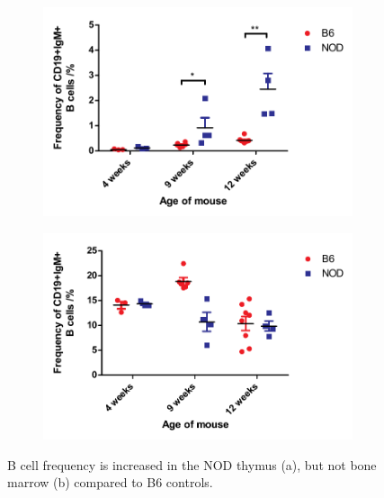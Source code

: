 \begin{figure}
	\begin{subfigure}{0.5\textwidth}
	\includegraphics[width=\textwidth]{Figures/IncthyBcells.pdf}
	\caption{}
	\label{subfig:IncthyBcells}
	\end{subfigure}
	\begin{subfigure}{0.5\textwidth}
	\includegraphics[width=\textwidth]{Figures/BMBcells.pdf}
	\caption{}
	\label{subfig:BMBcells}
	\end{subfigure}
\caption[NOD thymi have significantly more B cells than B6 thymi]{B cell frequency is increased in the NOD thymus (a), but not bone marrow (b) compared to B6 controls.}
\label{fig:IncthyBcells}
\end{figure}

